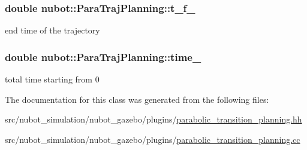 \hypertarget{classnubot_1_1ParaTrajPlanning_a2995e2352c13817a8aaa29f4c7c6f15b}{
\subsubsection[{t\-\_\-f\-\_\-}]{\setlength{\rightskip}{0pt plus 5cm}double nubot\-::\-Para\-Traj\-Planning\-::t\-\_\-f\-\_\-\hspace{0.3cm}{\ttfamily [private]}}}\label{classnubot_1_1ParaTrajPlanning_a2995e2352c13817a8aaa29f4c7c6f15b}


end time of the trajectory 

\hypertarget{classnubot_1_1ParaTrajPlanning_a1cca952be3e779a2276db9e9341f4c80}{
\subsubsection[{time\-\_\-}]{\setlength{\rightskip}{0pt plus 5cm}double nubot\-::\-Para\-Traj\-Planning\-::time\-\_\-\hspace{0.3cm}{\ttfamily [private]}}}\label{classnubot_1_1ParaTrajPlanning_a1cca952be3e779a2276db9e9341f4c80}


total time starting from 0 



The documentation for this class was generated from the following files\-:\begin{DoxyCompactItemize}
\item 
src/nubot\-\_\-simulation/nubot\-\_\-gazebo/plugins/\hyperlink{parabolic__transition__planning_8hh}{parabolic\-\_\-transition\-\_\-planning.\-hh}\item 
src/nubot\-\_\-simulation/nubot\-\_\-gazebo/plugins/\hyperlink{parabolic__transition__planning_8cc}{parabolic\-\_\-transition\-\_\-planning.\-cc}\end{DoxyCompactItemize}

